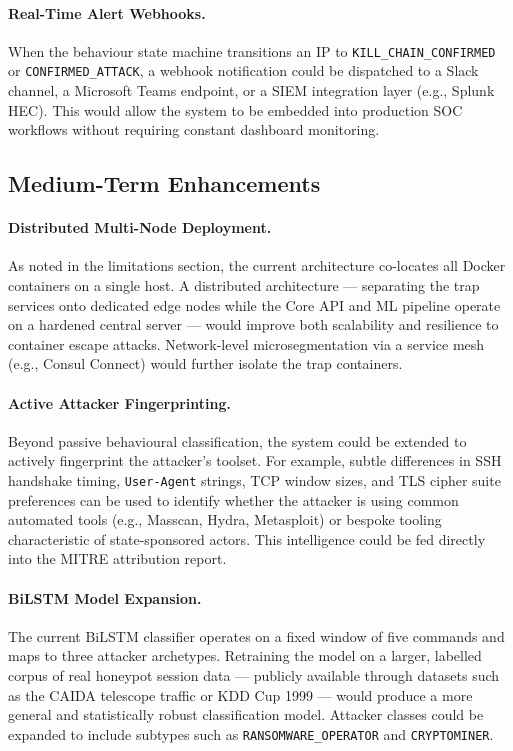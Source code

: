 \paragraph{Real-Time Alert Webhooks.}
When the behaviour state machine transitions an IP to \texttt{KILL\_CHAIN\_CONFIRMED} or \texttt{CONFIRMED\_ATTACK}, a webhook notification could be dispatched to a Slack channel, a Microsoft Teams endpoint, or a SIEM integration layer (e.g., Splunk HEC). This would allow the system to be embedded into production SOC workflows without requiring constant dashboard monitoring.

\subsection{Medium-Term Enhancements}

\paragraph{Distributed Multi-Node Deployment.}
As noted in the limitations section, the current architecture co-locates all Docker containers on a single host. A distributed architecture — separating the trap services onto dedicated edge nodes while the Core API and ML pipeline operate on a hardened central server — would improve both scalability and resilience to container escape attacks. Network-level microsegmentation via a service mesh (e.g., Consul Connect) would further isolate the trap containers.

\paragraph{Active Attacker Fingerprinting.}
Beyond passive behavioural classification, the system could be extended to actively fingerprint the attacker's toolset. For example, subtle differences in SSH handshake timing, \texttt{User-Agent} strings, TCP window sizes, and TLS cipher suite preferences can be used to identify whether the attacker is using common automated tools (e.g., Masscan, Hydra, Metasploit) or bespoke tooling characteristic of state-sponsored actors. This intelligence could be fed directly into the MITRE attribution report.

\paragraph{BiLSTM Model Expansion.}
The current BiLSTM classifier operates on a fixed window of five commands and maps to three attacker archetypes. Retraining the model on a larger, labelled corpus of real honeypot session data — publicly available through datasets such as the CAIDA telescope traffic or KDD Cup 1999 — would produce a more general and statistically robust classification model. Attacker classes could be expanded to include subtypes such as \texttt{RANSOMWARE\_OPERATOR} and \texttt{CRYPTOMINER}.

